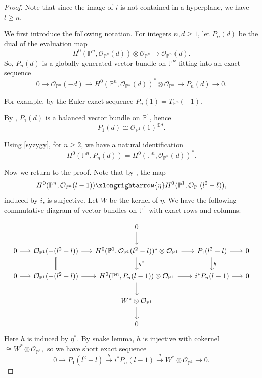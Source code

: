 \documentclass[11pt,letterpaper]{amsart}
\begin{document}
\begin{proof}
Note that since the image of $i$ is not contained in a hyperplane, we have $l\geq n$. 

We first introduce the following notation. For integers
$n,d\ge 1$, let $P_n(d)$ be the dual of the evaluation map
\[
H^0(\mathbb{P}^n,\mathcal{O}_{\mathbb{P}^n}(d))
\otimes
\mathcal{O}_{\mathbb{P}^n}
\longrightarrow
\mathcal{O}_{\mathbb{P}^n}(d).
\]
So, $P_n(d)$ is a globally generated vector bundle on
$\mathbb{P}^n$ fitting into an exact sequence
\begin{equation}\label{syzygy}
0
\longrightarrow
\mathcal{O}_{\mathbb{P}^n}(-d)
\longrightarrow
H^0(\mathbb{P}^n,\mathcal{O}_{\mathbb{P}^n}(d))^*
\otimes
\mathcal{O}_{\mathbb{P}^n}
\longrightarrow
P_n(d)
\longrightarrow
0.
\end{equation}

For example, by the Euler exact sequence $P_n(1)=T_{\mathbb{P}^n}(-1).$

By \cite[Lemma 2.1(a)]{coskun2019normal}, $P_1(d)$ is a balanced vector bundle on $\mathbb{P}^1$,
hence
\begin{equation}\label{p1d}
P_1(d)\cong \mathcal{O}_{\mathbb{P}^1}(1)^{\oplus d}.
\end{equation}

Using \eqref{syzygy}, for $n\ge 2$, we have a natural identification
\[
H^0(\mathbb{P}^n,P_n(d))
=
H^0(\mathbb{P}^n,\mathcal{O}_{\mathbb{P}^n}(d))^*.
\]


Now we return to the proof. Note that by \cite[Theorem, (i)]{gruson1983theorem}, the map 
\[
H^0(\mathbb{P}^n,\mathcal{O}_{\mathbb{P}^n}(l-1))
\xlongrightarrow{\eta}
H^0(\mathbb{P}^1,\mathcal{O}_{\mathbb{P}^1}(l^2-l)),
\] induced by $i$, is surjective. Let $W$ be the kernel of $\eta$. We have the following commutative diagram of vector bundles on $\mathbb{P}^1$ with exact rows and columns:

\begin{equation}\label{1}
\begin{tikzcd}[
column sep=1.5em,
row sep=1.8em
]
&
&
0 \arrow[d]
&
\\
0 \arrow[r]
&
\mathcal{O}_{\mathbb{P}^1}(-(l^2-l))
\arrow[r]
\arrow[d,equal]
&
H^0(\mathbb{P}^1,\mathcal{O}_{\mathbb{P}^1}(l^2-l))^*
\otimes \mathcal{O}_{\mathbb{P}^1}
\arrow[r]
\arrow[d,"\eta^*"]
&
P_1(l^2-l)
\arrow[r]
\arrow[d,"h"]
&
0
\\
0 \arrow[r]
&
\mathcal{O}_{\mathbb{P}^1}(-(l^2-l))
\arrow[r]
&
H^0(\mathbb{P}^n,P_n(l-1))
\otimes \mathcal{O}_{\mathbb{P}^1}
\arrow[r]
\arrow[d]
&
i^*P_n(l-1)
\arrow[r]
&
0
\\
&
&
W^*\otimes\mathcal{O}_{\mathbb{P}^1}
\arrow[d]
&
\\
&
&
0
&
\end{tikzcd}
\end{equation}
Here $h$ is induced by $\eta^*$.
By snake lemma, $h$ is injective with cokernel $\cong W^*\otimes\mathcal{O}_{\mathbb{P}^1},$ so we have short exact sequence
\begin{equation}\label{2}
0
\to
P_1(l^2-l)
\xrightarrow{h}
i^*P_n(l-1)
\xrightarrow{q}
W^*\otimes\mathcal{O}_{\mathbb{P}^1}
\to 0.
\end{equation}


\end{proof}
\end{document}
